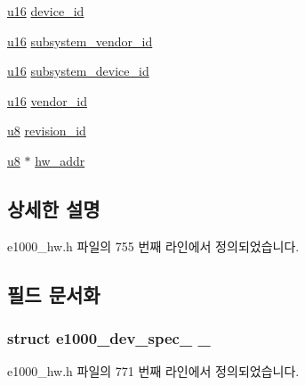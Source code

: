 \begin{DoxyCompactItemize}
\begin{tabbing}
\end{tabbing}\item 
\hyperlink{lib_2igb_2e1000__osdep_8h_acdc9cf0314be0ae5a01d6d4379a95edd}{u16} \hyperlink{structe1000__hw_acba8e06f20df2e05fadf4696cfdbc552}{device\+\_\+id}
\item 
\hyperlink{lib_2igb_2e1000__osdep_8h_acdc9cf0314be0ae5a01d6d4379a95edd}{u16} \hyperlink{structe1000__hw_a68f96c77fc612053fdb728712c4e7591}{subsystem\+\_\+vendor\+\_\+id}
\item 
\hyperlink{lib_2igb_2e1000__osdep_8h_acdc9cf0314be0ae5a01d6d4379a95edd}{u16} \hyperlink{structe1000__hw_ad22f037dfd3918464c6a5baadb0775d1}{subsystem\+\_\+device\+\_\+id}
\item 
\hyperlink{lib_2igb_2e1000__osdep_8h_acdc9cf0314be0ae5a01d6d4379a95edd}{u16} \hyperlink{structe1000__hw_a80302a87767931f95dfc264df7d0d253}{vendor\+\_\+id}
\item 
\hyperlink{lib_2igb_2e1000__osdep_8h_a8baca7e76da9e0e11ce3a275dd19130c}{u8} \hyperlink{structe1000__hw_a32f1ac5d313951f7044fdf5bb63ee596}{revision\+\_\+id}
\item 
\hyperlink{lib_2igb_2e1000__osdep_8h_a8baca7e76da9e0e11ce3a275dd19130c}{u8} $\ast$ \hyperlink{structe1000__hw_a2e65a30df9b06ba2471e4fdb1cbd9f6b}{hw\+\_\+addr}
\end{DoxyCompactItemize}


\subsection{상세한 설명}


e1000\+\_\+hw.\+h 파일의 755 번째 라인에서 정의되었습니다.



\subsection{필드 문서화}
\subsubsection[{\texorpdfstring{\+\_\+82575}{_82575}}]{\setlength{\rightskip}{0pt plus 5cm}struct {\bf e1000\+\_\+dev\+\_\+spec\+\_} \+\_}\hypertarget{structe1000__hw_a65abf35e3ce1758616d7990fdb4d356e}{}\label{structe1000__hw_a65abf35e3ce1758616d7990fdb4d356e}


e1000\+\_\+hw.\+h 파일의 771 번째 라인에서 정의되었습니다.

